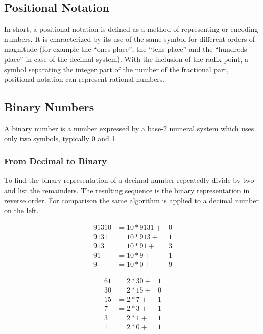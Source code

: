 \documentclass[10pt,a4paper]{scrartcl}
\begin{document}
\begin{multicols*}{2}
\section{Positional Notation}
\label{sec:PositionalNotation}

In short, a positional notation is defined as a method of representing or encoding numbers. It is characterized by its use of the same symbol for different orders of magnitude (for example the ``ones place'', the ``tens place'' and the ``hundreds place'' in case of the decimal system). With the inclusion of the radix point, a symbol separating the integer part of the number of the fractional part, positional notation can represent rational numbers.

\subsection{Binary Numbers}
\label{sec:BinaryNumbers}

A binary number is a number expressed by a base-2 numeral system which uses only two symbols, typically 0 and 1.

\subsubsection{From Decimal to Binary}
\label{sec:FromDecimalToBinary}

To find the binary representation of a decimal number repeatedly divide by two and list the remainders. The resulting sequence is the binary representation in reverse order. For comparison the same algorithm is applied to a decimal number on the left.

\begin{minipage}{0.45\linewidth}
\begin{align*}
91310&=10*9131+&0\\
9131&=10*913+&1\\
913&=10*91+&3\\
91&=10*9+&1\\
9&=10*0+&9
\end{align*}
\end{minipage}
\hfill
\begin{minipage}{0.45\linewidth}
\begin{align*}
61&=2*30+&1\\
30&=2*15+&0\\
15&=2*7+&1\\
7&=2*3+&1\\
3&=2*1+&1\\
1&=2*0+&1
\end{align*}
\end{minipage}


\end{multicols*}
\end{document}
